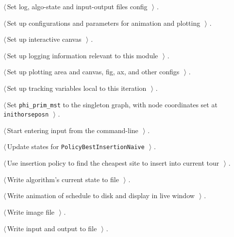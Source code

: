 \documentclass[11.5pt]{report}
\begin{document}
{\begin{list}{}{\setlength{\itemsep}{-\parsep}\setlength{\itemindent}{-\leftmargin}}
\item $\langle\,$Set log, algo-state and input-output files config\nobreak\ {\footnotesize {}}$\,\rangle$ {\footnotesize {\NWtxtRefIn} .}
\item $\langle\,$Set up configurations and parameters for animation and plotting\nobreak\ {\footnotesize {}}$\,\rangle$ {\footnotesize {\NWtxtRefIn} .}
\item $\langle\,$Set up interactive canvas\nobreak\ {\footnotesize {}}$\,\rangle$ {\footnotesize {\NWtxtRefIn} .}
\item $\langle\,$Set up logging information relevant to this module\nobreak\ {\footnotesize {}}$\,\rangle$ {\footnotesize {\NWtxtRefIn} .}
\item $\langle\,$Set up plotting area and canvas, fig, ax, and other configs\nobreak\ {\footnotesize {}}$\,\rangle$ {\footnotesize {\NWtxtRefIn} .}
\item $\langle\,$Set up tracking variables local to this iteration\nobreak\ {\footnotesize {}}$\,\rangle$ {\footnotesize {\NWtxtRefIn} .}
\item $\langle\,$Set \verb|phi_prim_mst| to the singleton graph, with node coordinates set at \verb|inithorseposn|\nobreak\ {\footnotesize {}}$\,\rangle$ {\footnotesize {\NWtxtRefIn} .}
\item $\langle\,$Start entering input from the command-line\nobreak\ {\footnotesize {}}$\,\rangle$ {\footnotesize {\NWtxtRefIn} .}
\item $\langle\,$Update states for \texttt{PolicyBestInsertionNaive}\nobreak\ {\footnotesize {}}$\,\rangle$ {\footnotesize {\NWtxtRefIn} .}
\item $\langle\,$Use insertion policy to find the cheapest site to insert into current tour\nobreak\ {\footnotesize {}}$\,\rangle$ {\footnotesize {\NWtxtRefIn} .}
\item $\langle\,$Write algorithm's current state to file\nobreak\ {\footnotesize {}}$\,\rangle$ {\footnotesize {\NWtxtRefIn} .}
\item $\langle\,$Write animation of schedule to disk and display in live window\nobreak\ {\footnotesize {}}$\,\rangle$ {\footnotesize {\NWtxtRefIn} .}
\item $\langle\,$Write image file\nobreak\ {\footnotesize {}}$\,\rangle$ {\footnotesize {\NWtxtRefIn} .}
\item $\langle\,$Write input and output to file\nobreak\ {\footnotesize {}}$\,\rangle$ {\footnotesize {\NWtxtRefIn} .}
\end{list}}
\end{document}
